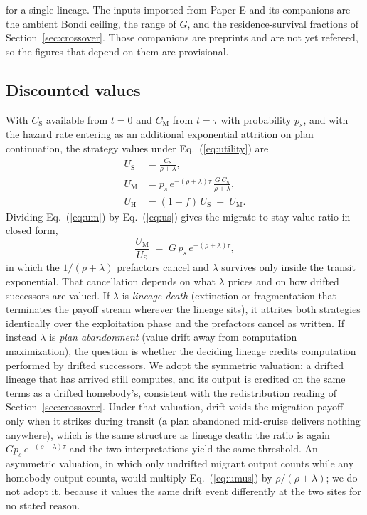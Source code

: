 \documentclass[11pt]{article}
\begin{document}
for a single lineage. The inputs imported from Paper E and its companions are the ambient Bondi ceiling, the range of $G$, and the residence-survival fractions of Section~\ref{sec:crossover}. Those companions are preprints and are not yet refereed, so the figures that depend on them are provisional.

\subsection{Discounted values}

With $C_{\mathrm S}$ available from $t = 0$ and $C_{\mathrm M}$ from $t = \tau$ with probability $p_{s}$, and with the hazard rate entering as an additional exponential attrition on plan continuation, the strategy values under Eq.~(\ref{eq:utility}) are
\begin{align}
U_{\mathrm S} &= \frac{C_{\mathrm S}}{\rho + \lambda},
\label{eq:us}\\[2pt]
U_{\mathrm M} &= p_{s}\, e^{-(\rho+\lambda)\tau}\, \frac{G\, C_{\mathrm S}}{\rho + \lambda},
\label{eq:um}\\[2pt]
U_{\mathrm H} &= (1 - f)\, U_{\mathrm S} \;+\; U_{\mathrm M}.
\label{eq:uh}
\end{align}
Dividing Eq.~(\ref{eq:um}) by Eq.~(\ref{eq:us}) gives the migrate-to-stay value ratio in closed form,
\begin{equation}
\frac{U_{\mathrm M}}{U_{\mathrm S}} \;=\; G\, p_{s}\, e^{-(\rho+\lambda)\tau},
\label{eq:umus}
\end{equation}
in which the $1/(\rho+\lambda)$ prefactors cancel and $\lambda$ survives only inside the transit exponential. That cancellation depends on what $\lambda$ prices and on how drifted successors are valued. If $\lambda$ is \emph{lineage death} (extinction or fragmentation that terminates the payoff stream wherever the lineage sits), it attrites both strategies identically over the exploitation phase and the prefactors cancel as written. If instead $\lambda$ is \emph{plan abandonment} (value drift away from computation maximization), the question is whether the deciding lineage credits computation performed by drifted successors. We adopt the symmetric valuation: a drifted lineage that has arrived still computes, and its output is credited on the same terms as a drifted homebody's, consistent with the redistribution reading of Section~\ref{sec:crossover}. Under that valuation, drift voids the migration payoff only when it strikes during transit (a plan abandoned mid-cruise delivers nothing anywhere), which is the same structure as lineage death: the ratio is again $G p_{s}\, e^{-(\rho+\lambda)\tau}$ and the two interpretations yield the same threshold. An asymmetric valuation, in which only undrifted migrant output counts while any homebody output counts, would multiply Eq.~(\ref{eq:umus}) by $\rho/(\rho+\lambda)$; we do not adopt it, because it values the same drift event differently at the two sites for no stated reason.
\end{document}
